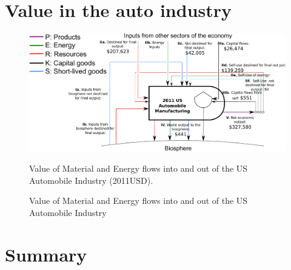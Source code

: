 \section{Value in the auto industry}
\label{sec:value_auto}

\begin{figure}[!ht]
\centering
\includegraphics[width=1.0\linewidth]{Part_3/Chapter_Values/images/PERKS_basic_unit_value_auto_ind.pdf}
\caption{Value of Material and Energy flows into and out of the US Automobile Industry}{Value of Material and Energy flows into and out of the US Automobile Industry (2011USD).}
\label{fig:PERKS_value_auto_ind}
\end{figure}


\section{Summary}
\label{sec:value_summary}








%
%

